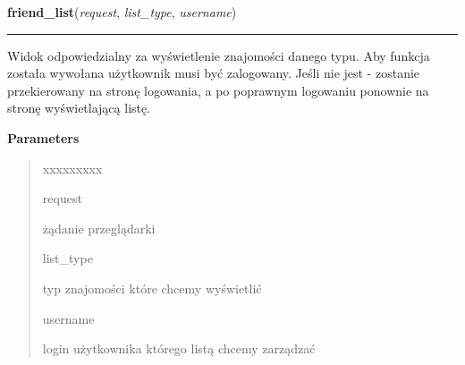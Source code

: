 \hspace{.8\funcindent}\begin{boxedminipage}{\funcwidth}

    \raggedright \textbf{friend\_list}(\textit{request}, \textit{list\_type}, \textit{username})

    \vspace{-1.5ex}

    \rule{\textwidth}{0.5\fboxrule}
\setlength{\parskip}{2ex}
    Widok odpowiedzialny za wyświetlenie znajomości danego typu. Aby 
    funkcja została wywołana użytkownik musi być zalogowany. Jeśli nie jest
    - zostanie przekierowany na stronę logowania, a po poprawnym logowaniu 
    ponownie na stronę wyświetlającą listę.

\setlength{\parskip}{1ex}
      \textbf{Parameters}
      \vspace{-1ex}

      \begin{quote}
        \begin{Ventry}{xxxxxxxxx}

          \item[request]

          żądanie przeglądarki

          \item[list\_type]

          typ znajomości które chcemy wyświetlić

          \item[username]

          login użytkownika którego listą chcemy zarządzać

        \end{Ventry}

      \end{quote}

    \end{boxedminipage}

    \label{ass8_portal:friends:views:add_friend}

    \vspace{0.5ex}

